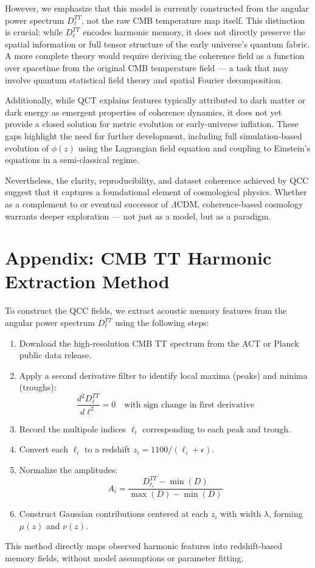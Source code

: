 \documentclass[12pt]{article}
\begin{document}
	However, we emphasize that this model is currently constructed from the angular power spectrum \( D_\ell^{TT} \), not the raw CMB temperature map itself. This distinction is crucial: while \( D_\ell^{TT} \) encodes harmonic memory, it does not directly preserve the spatial information or full tensor structure of the early universe's quantum fabric. A more complete theory would require deriving the coherence field as a function over spacetime from the original CMB temperature field — a task that may involve quantum statistical field theory and spatial Fourier decomposition.

	Additionally, while QCT explains features typically attributed to dark matter or dark energy as emergent properties of coherence dynamics, it does not yet provide a closed solution for metric evolution or early-universe inflation. These gaps highlight the need for further development, including full simulation-based evolution of \( \phi(z) \) using the Lagrangian field equation and coupling to Einstein's equations in a semi-classical regime.

	Nevertheless, the clarity, reproducibility, and dataset coherence achieved by QCC suggest that it captures a foundational element of cosmological physics. Whether as a complement to or eventual successor of \( \Lambda \)CDM, coherence-based cosmology warrants deeper exploration — not just as a model, but as a paradigm.

	\appendix
	\section*{Appendix: CMB TT Harmonic Extraction Method}
	To construct the QCC fields, we extract acoustic memory features from the angular power spectrum \( D_\ell^{TT} \) using the following steps:
	\begin{enumerate}
		\item Download the high-resolution CMB TT spectrum from the ACT or Planck public data release.
		\item Apply a second derivative filter to identify local maxima (peaks) and minima (troughs):
		\[
		\frac{d^2 D_\ell^{TT}}{d\ell^2} = 0 \quad \text{with sign change in first derivative}
		\]
		\item Record the multipole indices \( \ell_i \) corresponding to each peak and trough.
		\item Convert each \( \ell_i \) to a redshift \( z_i = 1100 / (\ell_i + \epsilon) \).
		\item Normalize the amplitudes:
		\[
		A_i = \frac{D_{\ell_i}^{TT} - \min(D)}{\max(D) - \min(D)}
		\]
		\item Construct Gaussian contributions centered at each \( z_i \) with width \( \lambda \), forming \( \mu(z) \) and \( \nu(z) \).
	\end{enumerate}
	This method directly maps observed harmonic features into redshift-based memory fields, without model assumptions or parameter fitting.
	
	
\end{document}
